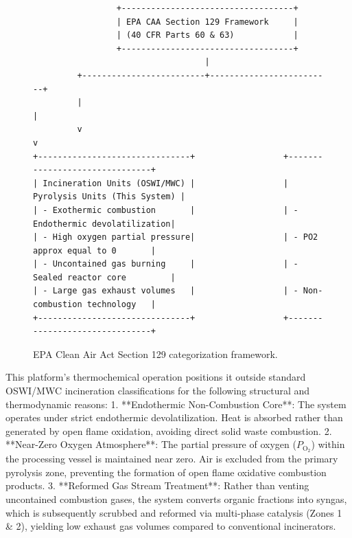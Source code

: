 \documentclass[10pt,twocolumn,a4paper]{article}
\begin{document}
\begin{figure}[H]
\centering
\small
\begin{verbatim}
                 +-----------------------------------+
                 | EPA CAA Section 129 Framework     |
                 | (40 CFR Parts 60 & 63)            |
                 +-----------------------------------+
                                   |
         +-------------------------+-------------------------+
         |                                                   |
         v                                                   v
+-------------------------------+                  +-------------------------------+
| Incineration Units (OSWI/MWC) |                  | Pyrolysis Units (This System) |
| - Exothermic combustion       |                  | - Endothermic devolatilization|
| - High oxygen partial pressure|                  | - PO2 approx equal to 0       |
| - Uncontained gas burning     |                  | - Sealed reactor core         |
| - Large gas exhaust volumes   |                  | - Non-combustion technology   |
+-------------------------------+                  +-------------------------------+
\end{verbatim}
\caption{EPA Clean Air Act Section 129 categorization framework.}
\label{fig:epa_framework}
\end{figure}

This platform's thermochemical operation positions it outside standard OSWI/MWC incineration classifications for the following structural and thermodynamic reasons:
1. **Endothermic Non-Combustion Core**: The system operates under strict endothermic devolatilization. Heat is absorbed rather than generated by open flame oxidation, avoiding direct solid waste combustion.
2. **Near-Zero Oxygen Atmosphere**: The partial pressure of oxygen ($P_{\text{O}_2}$) within the processing vessel is maintained near zero. Air is excluded from the primary pyrolysis zone, preventing the formation of open flame oxidative combustion products.
3. **Reformed Gas Stream Treatment**: Rather than venting uncontained combustion gases, the system converts organic fractions into syngas, which is subsequently scrubbed and reformed via multi-phase catalysis (Zones 1 \& 2), yielding low exhaust gas volumes compared to conventional incinerators.
\end{document}
